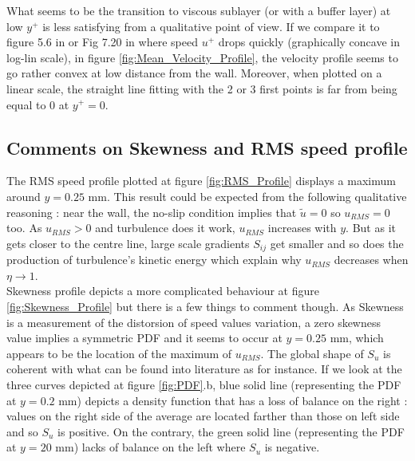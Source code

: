 \documentclass[12pt]{article}
\begin{document}
What seems to be the transition to viscous sublayer (or with a buffer layer) at low $y^+$ is less satisfying from a qualitative point of view. If we compare it to figure 5.6 in \cite{tennekesFirstCourseTurbulence1972} or Fig 7.20 in \cite{popeTurbulentFlows2000a} where speed $u^+$ drops quickly (graphically concave in log-lin scale),  in figure \ref{fig:Mean_Velocity_Profile}, the velocity profile seems to go rather convex at low distance from the wall. Moreover, when plotted on a linear scale, the straight line fitting with the 2 or 3 first points is far from being equal to 0 at $y^+ = 0$. \\ %

\subsection{Comments on Skewness and RMS speed profile}

The RMS speed profile plotted at figure \ref{fig:RMS_Profile} displays a maximum around $y = 0.25$ \si{mm}. This result could be expected from the following qualitative reasoning : near the wall, the no-slip condition implies that $\tilde{u} = 0$ so $u_{RMS} = 0$ too. As $u_{RMS} > 0$ and turbulence does it work, $u_{RMS}$ increases with $y$. But as it gets closer to the centre line, large scale gradients $S_{ij}$ get smaller and so does the production of turbulence's kinetic energy which explain why $u_{RMS}$ decreases when $\eta \rightarrow 1$.\\

Skewness profile depicts a more complicated behaviour at figure \ref{fig:Skewness_Profile} but there is a few things to comment though. As Skewness is a measurement of the distorsion of speed values variation, a zero skewness value implies a symmetric PDF and it seems to occur at $y = 0.25$ \si{mm}, which appears to be the location of the maximum of $u_{RMS}$. The global shape of $S_u$ is coherent with what can be found into literature as \cite{mathisRelationshipVelocitySkewness2011} for instance. If we look at the three curves depicted at figure \ref{fig:PDF}.b, blue solid line (representing the PDF at $y=0.2$ \si{mm}) depicts a density function that has a loss of balance on the right : values on the right side of the average are located farther than those on left side and so $S_u$ is positive. On the contrary, the green solid line (representing the PDF at $y=20$ \si{mm}) lacks of balance on the left where $S_u$ is negative.\\
\end{document}
